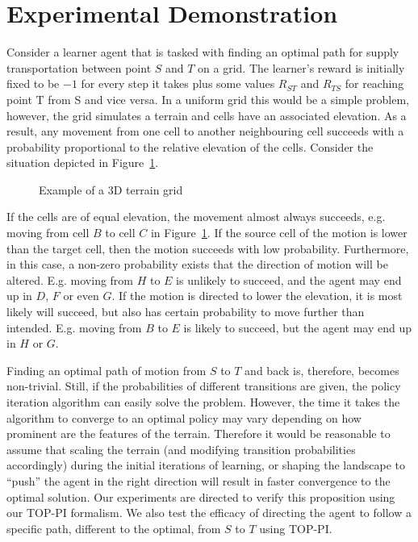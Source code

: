 \section{Experimental Demonstration}\label{sec: experiments}
Consider a learner agent that is tasked with finding an optimal path
for supply transportation between point $S$ and $T$ on a grid. The
learner's reward is initially fixed to be $-1$ for every step it takes
plus some values $R_{ST}$ and $R_{TS}$ for reaching point T from S and
vice versa. In a uniform grid this would be a simple problem, however,
the grid simulates a terrain and cells have an associated elevation.  
As a result, any movement from one cell to another neighbouring cell
succeeds with a probability proportional to the relative elevation of 
the cells. Consider the situation depicted in Figure~\ref{exp_motion}. 

\begin{figure}[ht]
\centerline{}
\caption{\label{exp_motion}Example of a 3D terrain grid}
\end{figure}

If the cells are of equal elevation, the movement almost always
succeeds, e.g. moving from cell $B$ to cell $C$ in
Figure~\ref{exp_motion}. If the source cell of the motion is lower
than the target cell, then the motion succeeds with low
probability. Furthermore, in this case, a non-zero probability exists
that the direction of motion will be altered. E.g. moving from $H$ to
$E$ is unlikely to succeed, and the agent may end up in $D$, $F$ or
even $G$. If the motion is directed to lower the elevation, it is most
likely will succeed, but also has certain probability to move further
than intended. E.g. moving from $B$ to $E$ is likely to succeed, but
the agent may end up in $H$ or $G$.

Finding an optimal path of motion from $S$ to $T$ and back is,
therefore, becomes non-trivial. Still, if the probabilities of
different transitions are given, the policy iteration algorithm can
easily solve the problem. However, the time it takes the algorithm to
converge to an optimal policy may vary depending on how prominent are
the features of the terrain. Therefore it would be reasonable to
assume that scaling the terrain (and modifying transition
probabilities accordingly) during the initial iterations of learning,
or shaping the landscape to ``push'' the agent in the right direction
will result in faster convergence to the optimal solution. Our
experiments are directed to verify this proposition using our TOP-PI
formalism.  We also test the efficacy of directing the agent to follow
a specific path, different to the optimal, from $S$ to $T$ using TOP-PI.

